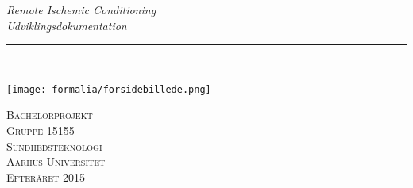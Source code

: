 \thispagestyle{empty}
\begin{flushright}
\vspace{3cm}

\phantom{hul}

\phantom{hul}

\phantom{hul}

\textsl{\Huge Remote Ischemic Conditioning} \\ \vspace{1cm}
\textsl{\Huge Udviklingsdokumentation} \\ \vspace{1cm}

\rule{\textwidth}{3mm} \\ \vspace{1.5cm}
\vspace{1cm}

\texttt{[image: formalia/forsidebillede.png]}

\vspace{2cm} 
\textsc{\Large Bachelorprojekt \\
Gruppe 15155 \\
Sundhedsteknologi \\
Aarhus Universitet \\
Efteråret 2015 \\}
\end{flushright}
